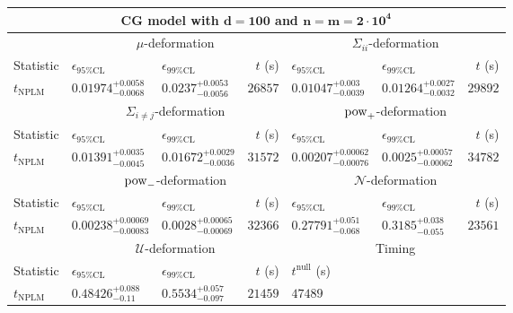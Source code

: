 \begin{tabular}{l|llr|llr}
	\toprule
	\multicolumn{7}{c}{{\bf CG model with $\mathbf{d=100}$ and $\mathbf{n=m=2\cdot 10^{4}}$}} \\
	\toprule
	\multicolumn{1}{c}{} & \multicolumn{3}{c}{$\mu$-deformation} & \multicolumn{3}{c}{$\Sigma_{ii}$-deformation} \\
	Statistic & $\epsilon_{95\%\mathrm{CL}}$ & $\epsilon_{99\%\mathrm{CL}}$ & $t$ (s) & $\epsilon_{95\%\mathrm{CL}}$ & $\epsilon_{99\%\mathrm{CL}}$ & $t$ (s) \\
	\midrule
	$t_{\mathrm{NPLM}}$ & $0.01974_{-0.0068}^{+0.0058}$ & $0.0237_{-0.0056}^{+0.0053}$ & $26857$ & $0.01047_{-0.0039}^{+0.003}$ & $0.01264_{-0.0032}^{+0.0027}$ & $29892$ \\
	\toprule
	\multicolumn{1}{c}{} & \multicolumn{3}{c}{$\Sigma_{i\neq j}$-deformation} & \multicolumn{3}{c}{$\rm{pow}_{+}$-deformation} \\
	Statistic & $\epsilon_{95\%\mathrm{CL}}$ & $\epsilon_{99\%\mathrm{CL}}$ & $t$ (s) & $\epsilon_{95\%\mathrm{CL}}$ & $\epsilon_{99\%\mathrm{CL}}$ & $t$ (s) \\
	\midrule
	$t_{\mathrm{NPLM}}$ & $0.01391_{-0.0045}^{+0.0035}$ & $0.01672_{-0.0036}^{+0.0029}$ & $31572$ & $0.00207_{-0.00076}^{+0.00062}$ & $0.0025_{-0.00062}^{+0.00057}$ & $34782$ \\
	\toprule
	\multicolumn{1}{c}{} & \multicolumn{3}{c}{$\rm{pow}_{-}$-deformation} & \multicolumn{3}{c}{$\mathcal{N}$-deformation} \\
	Statistic & $\epsilon_{95\%\mathrm{CL}}$ & $\epsilon_{99\%\mathrm{CL}}$ & $t$ (s) & $\epsilon_{95\%\mathrm{CL}}$ & $\epsilon_{99\%\mathrm{CL}}$ & $t$ (s) \\
	\midrule
	$t_{\mathrm{NPLM}}$ & $0.00238_{-0.00083}^{+0.00069}$ & $0.0028_{-0.00069}^{+0.00065}$ & $32366$ & $0.27791_{-0.068}^{+0.051}$ & $0.3185_{-0.055}^{+0.038}$ & $23561$ \\
	\toprule
	\multicolumn{1}{c}{} & \multicolumn{3}{c}{$\mathcal{U}$-deformation} & \multicolumn{3}{c}{Timing} \\
	Statistic & $\epsilon_{95\%\mathrm{CL}}$ & $\epsilon_{99\%\mathrm{CL}}$ & $t$ (s) & $t^{\mathrm{null}}$ (s) \\
	\midrule
	$t_{\mathrm{NPLM}}$ & $0.48426_{-0.11}^{+0.088}$ & $0.5534_{-0.097}^{+0.057}$ & $21459$ & $47489$ \\
	\bottomrule
\end{tabular}
